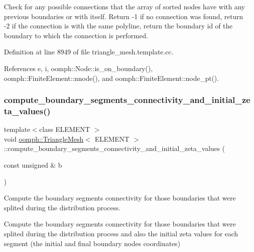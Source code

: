 Check for any possible connections that the array of sorted nodes have with any previous boundaries or with itself. Return -\/1 if no connection was found, return -\/2 if the connection is with the same polyline, return the boundary id of the boundary to which the connection is performed. 



Definition at line 8949 of file triangle\+\_\+mesh.\+template.\+cc.



References e, i, oomph\+::\+Node\+::is\+\_\+on\+\_\+boundary(), oomph\+::\+Finite\+Element\+::nnode(), and oomph\+::\+Finite\+Element\+::node\+\_\+pt().

\mbox{\label{classoomph_1_1TriangleMesh_a18322e3238acaf2c0d3c473b5fac4c91}} 
\subsubsection{\texorpdfstring{compute\+\_\+boundary\+\_\+segments\+\_\+connectivity\+\_\+and\+\_\+initial\+\_\+zeta\+\_\+values()}{compute\_boundary\_segments\_connectivity\_and\_initial\_zeta\_values()}}
{\footnotesize\ttfamily template$<$class E\+L\+E\+M\+E\+NT $>$ \\
void \hyperlink{classoomph_1_1TriangleMesh}{oomph\+::\+Triangle\+Mesh}$<$ E\+L\+E\+M\+E\+NT $>$\+::compute\+\_\+boundary\+\_\+segments\+\_\+connectivity\+\_\+and\+\_\+initial\+\_\+zeta\+\_\+values (\begin{DoxyParamCaption}\item[{const unsigned \&}]{b }\end{DoxyParamCaption})}



Compute the boundary segments connectivity for those boundaries that were splited during the distribution process. 

Compute the boundary segments connectivity for those boundaries that were splited during the distribution process and also the initial zeta values for each segment (the initial and final boundary nodes coordinates) 


